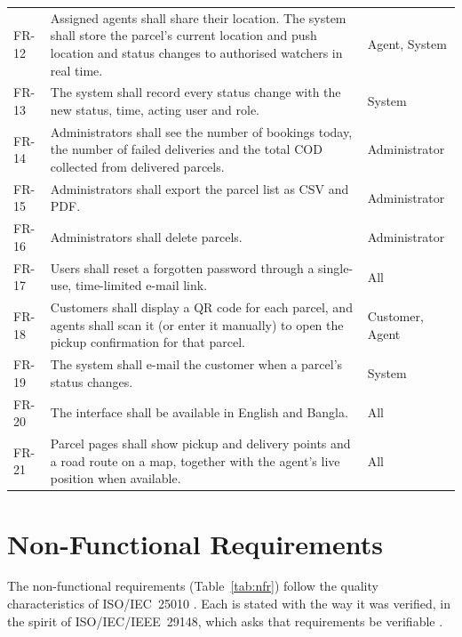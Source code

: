 \begin{longtable}{@{}P{1.3cm}P{9.2cm}P{3.2cm}@{}}
FR-12 & Assigned agents shall share their location. The system shall store the parcel's current location and push location and status changes to authorised watchers in real time. & Agent, System \\
FR-13 & The system shall record every status change with the new status, time, acting user and role. & System \\
FR-14 & Administrators shall see the number of bookings today, the number of failed deliveries and the total COD collected from delivered parcels. & Administrator \\
FR-15 & Administrators shall export the parcel list as CSV and PDF. & Administrator \\
FR-16 & Administrators shall delete parcels. & Administrator \\
FR-17 & Users shall reset a forgotten password through a single-use, time-limited e-mail link. & All \\
FR-18 & Customers shall display a QR code for each parcel, and agents shall scan it (or enter it manually) to open the pickup confirmation for that parcel. & Customer, Agent \\
FR-19 & The system shall e-mail the customer when a parcel's status changes. & System \\
FR-20 & The interface shall be available in English and Bangla. & All \\
FR-21 & Parcel pages shall show pickup and delivery points and a road route on a map, together with the agent's live position when available. & All \\
\bottomrule
\end{longtable}

\section{Non-Functional Requirements}
\label{sec:nfr}

The non-functional requirements (Table~\ref{tab:nfr}) follow the quality characteristics of ISO/IEC~25010 \cite{iso25010}. Each is stated with the way it was verified, in the spirit of ISO/\allowbreak IEC/\allowbreak IEEE~29148, which asks that requirements be verifiable \cite{iso29148}.


